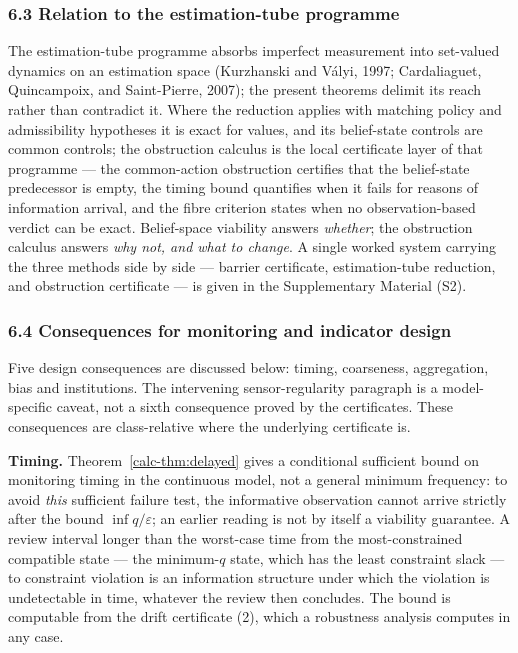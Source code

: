 \documentclass[10pt,twocolumn]{article}
\theoremstyle{definition}
\begin{document}
\subsubsection{6.3 Relation to the estimation-tube
programme}\label{calc-relation-to-the-estimation-tube-programme}

The estimation-tube programme absorbs imperfect measurement into set-valued dynamics on an estimation space (Kurzhanski and V\'alyi, 1997; Cardaliaguet, Quincampoix, and Saint-Pierre, 2007); the present theorems delimit its reach rather than contradict it. Where the reduction applies with matching policy and admissibility hypotheses it is exact for values, and its belief-state controls are common controls; the obstruction calculus is the local certificate layer of that programme --- the common-action obstruction certifies that the belief-state predecessor is empty, the timing bound quantifies when it fails for reasons of information arrival, and the fibre criterion states when no observation-based verdict can be exact. Belief-space viability answers \emph{whether}; the obstruction calculus answers \emph{why not, and what to change}. A single worked system carrying the three methods side by side --- barrier certificate, estimation-tube reduction, and obstruction certificate --- is given in the Supplementary Material (S2).

\subsubsection{6.4 Consequences for monitoring and indicator
design}\label{calc-consequences-for-monitoring-and-indicator-design}



Five design consequences are discussed below: timing, coarseness, aggregation, bias and institutions. The intervening sensor-regularity paragraph is a model-specific caveat, not a sixth consequence proved by the certificates. These consequences are class-relative where the underlying certificate is.

\textbf{Timing.} Theorem~\ref{calc-thm:delayed} gives a conditional sufficient bound on
monitoring timing in the continuous model, not a general minimum frequency: to avoid \emph{this} sufficient failure test, the informative observation cannot arrive strictly after the bound \(\inf q / \varepsilon\); an earlier reading is not by itself a viability guarantee. A review interval longer than the
worst-case time from the most-constrained compatible state --- the
minimum-\(q\) state, which has the least constraint slack --- to
constraint violation is an information structure under which the
violation is undetectable in time, whatever the review then concludes.
The bound is computable from the drift certificate (2), which a robustness analysis computes in any case.
\end{document}

